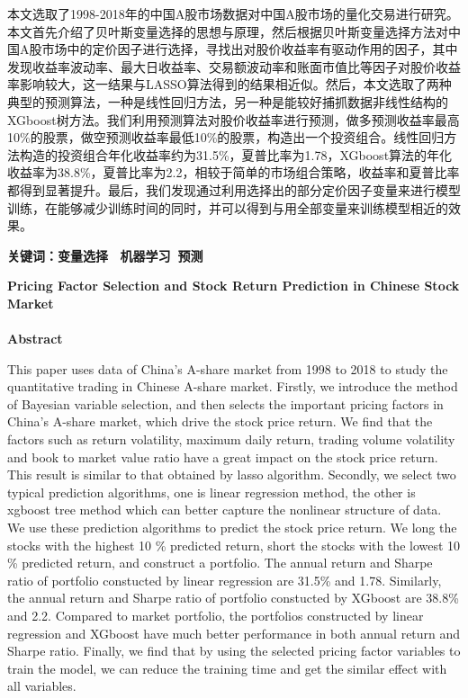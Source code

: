 \documentclass[12pt]{article} %
\begin{document}
	本文选取了1998-2018年的中国A股市场数据对中国A股市场的量化交易进行研究。本文首先介绍了贝叶斯变量选择的思想与原理，然后根据贝叶斯变量选择方法对中国A股市场中的定价因子进行选择，寻找出对股价收益率有驱动作用的因子，其中发现收益率波动率、最大日收益率、交易额波动率和账面市值比等因子对股价收益率影响较大，这一结果与LASSO算法得到的结果相近似。然后，本文选取了两种典型的预测算法，一种是线性回归方法，另一种是能较好捕抓数据非线性结构的XGboost树方法。我们利用预测算法对股价收益率进行预测，做多预测收益率最高10\%的股票，做空预测收益率最低10\%的股票，构造出一个投资组合。线性回归方法构造的投资组合年化收益率约为31.5\%，夏普比率为1.78，XGboost算法的年化收益率为38.8\%，夏普比率为2.2，相较于简单的市场组合策略，收益率和夏普比率都得到显著提升。最后，我们发现通过利用选择出的部分定价因子变量来进行模型训练，在能够减少训练时间的同时，并可以得到与用全部变量来训练模型相近的效果。
	
	\textbf{关键词：变量选择~  机器学习~预测}
	
	\newpage
	\thispagestyle{empty}
	\begin{center}
		\large \textbf{Pricing Factor Selection and Stock Return Prediction in Chinese Stock Market} ~\\ ~\\
		\normalsize \textbf{Abstract}
	\end{center}
	
	This paper uses data of China's A-share market from 1998 to 2018 to study the quantitative trading in Chinese A-share market. Firstly, we introduce the method of Bayesian variable selection, and then selects the important pricing factors in China's A-share market, which drive the stock price return. We find that the factors such as return volatility, maximum daily return, trading volume volatility and book to market value ratio have a great impact on the stock price return. This result is similar to that obtained by lasso algorithm. Secondly, we select two typical prediction algorithms, one is linear regression method, the other is xgboost tree method which can better capture the nonlinear structure of data. We use these prediction algorithms to predict the stock price return. We long the stocks with the highest 10 \% predicted return, short the stocks with the lowest 10 \% predicted return, and construct a portfolio. The annual return and Sharpe ratio of portfolio constucted by linear regression are 31.5\% and 1.78. Similarly, the annual return and Sharpe ratio of portfolio constucted by XGboost are 38.8\% and 2.2. Compared to market portfolio, the portfolios constructed by linear regression and XGboost have much better performance in both annual return and Sharpe ratio. Finally, we find that by using the selected pricing factor variables to train the model, we can reduce the training time and get the similar effect with all variables.
	
\end{document}

